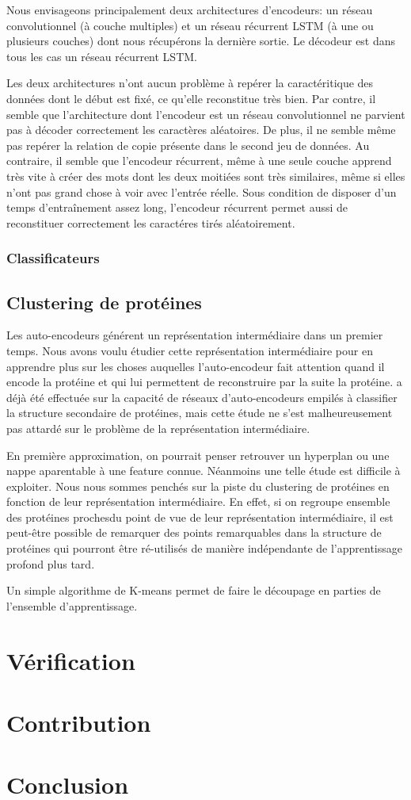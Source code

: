 \documentclass[a4paper,11pt]{article}
\begin{document}
Nous envisageons principalement deux architectures d'encodeurs: un réseau
convolutionnel (à couche multiples) et un réseau récurrent LSTM (à une ou plusieurs
couches) dont nous récupérons la dernière sortie. Le décodeur est dans tous les
cas un réseau récurrent LSTM.

Les deux architectures n'ont aucun problème à repérer la caractéritique des données dont le
début est fixé, ce qu'elle reconstitue très bien. Par contre, il semble que l'architecture dont l'encodeur est un
réseau convolutionnel ne parvient pas à décoder correctement les caractères
aléatoires. De plus, il ne semble même pas repérer la relation de \og copie\fg
présente dans le second jeu de données. Au contraire, il semble que l'encodeur
récurrent, même à une seule couche apprend très vite à créer des mots dont les
deux moitiées sont très similaires, même si elles n'ont pas grand chose à voir
avec l'entrée réelle. Sous condition de disposer d'un temps d'entraînement assez
long, l'encodeur récurrent permet aussi de reconstituer correctement les
caractéres tirés aléatoirement.

\subsubsection{Classificateurs}


\subsection{Clustering de protéines}

Les auto-encodeurs générent un représentation intermédiaire dans un premier
temps. Nous avons voulu étudier cette représentation intermédiaire pour en
apprendre plus sur les choses auquelles l'auto-encodeur fait attention quand il
encode la protéine et qui lui permettent de reconstruire par la suite la
protéine. \cite{jian2013predicting} a déjà été effectuée sur la capacité de réseaux d'auto-encodeurs
empilés à classifier la structure secondaire de protéines, mais cette étude ne
s'est malheureusement pas attardé sur le problème de la représentation intermédiaire.

En première approximation, on pourrait penser retrouver un hyperplan ou une
nappe aparentable à une feature connue. Néanmoins une telle étude est difficile
à exploiter. Nous nous sommes penchés sur la piste du clustering
de protéines en fonction de leur représentation intermédiaire. En effet, si on
regroupe ensemble des protéines \og proches\fg du point de vue de leur
représentation intermédiaire, il est peut-être possible de remarquer
des points remarquables dans la structure de protéines qui pourront être
ré-utilisés de manière indépendante de l'apprentissage profond plus tard.

Un simple algorithme de K-means permet de faire le découpage en parties de
l'ensemble d'apprentissage.

\section{Vérification}

\section{Contribution}

\section*{Conclusion}

\printbibliography
\end{document}
